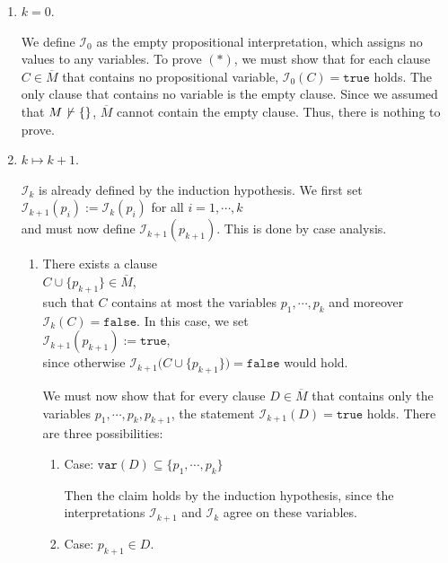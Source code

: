 \begin{enumerate}
\item[I.A.:] $k=0$.
 
  We define $\mathcal{I}_0$ as the empty propositional interpretation, which assigns no
  values to any variables. To prove $(*)$, we must show that for each clause $C \in \overline{M}$ that contains
  no propositional variable, $\mathcal{I}_0(C) = \mathtt{true}$ holds. The only clause that contains
  no variable is the empty clause. Since we assumed that $M \not\,\vdash \{\}$,
  $\overline{M}$ cannot contain the empty clause. Thus, there is nothing to prove.
\item[I.S.:] $k \mapsto k+1$.

  $\mathcal{I}_k$ is already defined by the induction hypothesis. We first set
  \\[0.2cm]
  \hspace*{1.3cm}
  $\mathcal{I}_{k+1}(p_i) := \mathcal{I}_k(p_i)$ \quad for all $i=1,\cdots,k$
  \\[0.2cm]
  and must now define $\mathcal{I}_{k+1}(p_{k+1})$. This is done by case analysis.
  \begin{enumerate}
  \item There exists a clause
    \\[0.2cm]
    \hspace*{1.3cm}
    $C \cup \{p_{k+1}\} \in \overline{M}$,
    \\[0.2cm]
    such that $C$ contains at most the variables $p_1,\cdots,p_k$ and moreover $\mathcal{I}_k(C) = \mathtt{false}$.
    In this case, we set
    \\[0.2cm]
    \hspace*{1.3cm}
    $\mathcal{I}_{k+1}(p_{k+1}) := \mathtt{true}$,
    \\[0.2cm]    
    since otherwise $\mathcal{I}_{k+1}\bigl(C \cup \{p_{k+1}\}\bigr) = \mathtt{false}$ would hold. 

    We must now show that for every clause $D \in \overline{M}$ that contains only the variables \linebreak
    $p_1,\cdots,p_k,p_{k+1}$, the statement $\mathcal{I}_{k+1}(D) = \mathtt{true}$ holds. There are three
    possibilities:
    \begin{enumerate}[1.]
    \item Case: $\mathtt{var}(D) \subseteq \{p_1,\cdots,p_k\}$

          Then the claim holds by the induction hypothesis, since the interpretations
          $\mathcal{I}_{k+1}$ and $\mathcal{I}_k$ agree on these variables.
    \item Case: $p_{k+1} \in D$.
          

\end{enumerate}
\end{enumerate}
\end{enumerate}
